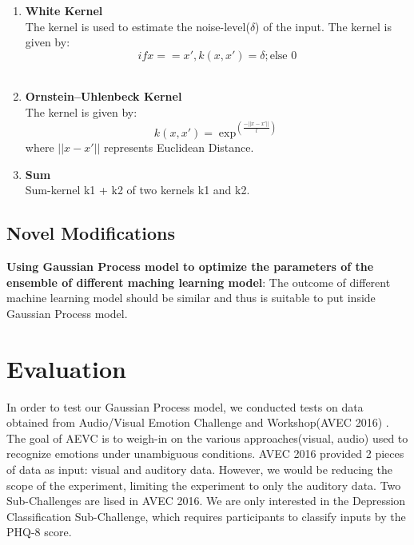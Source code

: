 \documentclass{article}
\begin{document}
\begin{enumerate}
		\item \textbf{White Kernel}\\
		The kernel is used to estimate the noise-level(\(\delta\)) of the input. 
		The kernel is given by:
		\begin{equation}\label{eq:kernel_noise}
			if x == x', k(x,x') = \delta ; \text{else 0}
		\end{equation}
		\\

		\item \textbf{Ornstein–Uhlenbeck Kernel}\\
		The kernel is given by:
		\begin{equation}\label{eq:kernel_ou}
			k(x,x') = \exp^{(\frac{-||x - x'||}{l})}
		\end{equation}
		where \(||x - x'||\) represents Euclidean Distance. \\

		\item \textbf{Sum}\\
		Sum-kernel k1 + k2 of two kernels k1 and k2.\\
	\end{enumerate}

	\subsection{Novel Modifications}
	\textbf{Using Gaussian Process model to optimize the parameters of the ensemble of different maching learning model}: 
	The outcome of different machine learning model should be similar and thus is suitable to put inside Gaussian Process model.

	\section{Evaluation}
	In order to test our Gaussian Process model, we conducted tests on data obtained from Audio/Visual Emotion Challenge and Workshop(AVEC 2016) \cite{avec2016}. The goal of AEVC is to weigh-in on the various approaches(visual, audio) used to recognize emotions under unambiguous conditions. AVEC 2016 provided 2 pieces of data as input: visual and auditory data. However, we would be reducing the scope of the experiment, limiting the experiment to only the auditory data. Two Sub-Challenges are lised in AVEC 2016. We are only interested in the Depression Classification Sub-Challenge, which requires participants to classify inputs by the PHQ-8 score.
\end{document}
